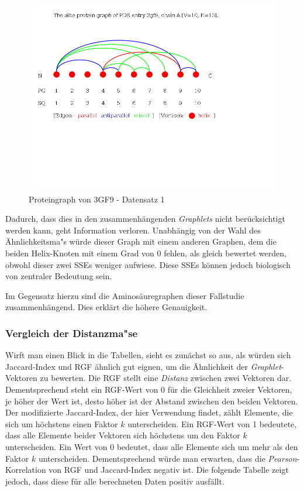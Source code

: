 \documentclass{report}
\begin{document}
\begin{figure}[h!]
\includegraphics[scale=0.5]{3gf9_A_albe_PG.png}
\caption{Proteingraph von 3GF9 - Datensatz 1}
\end{figure}

Dadurch, dass dies in den zusammenh\"angenden \textit{Graphlets} nicht ber\"ucksichtigt werden kann, geht Information verloren. Unabh\"angig von der Wahl des \"Ahnlichkeitsma"s w\"urde dieser Graph mit einem anderen Graphen, dem die beiden Helix-Knoten mit einem Grad von 0 fehlen, als gleich bewertet werden, obwohl dieser zwei SSEs weniger aufwiese. Diese SSEs k\"onnen jedoch biologisch von zentraler Bedeutung sein.

Im Gegensatz hierzu sind die Aminos\"auregraphen dieser Fallstudie zusammenh\"angend. Dies erkl\"art die h\"ohere Genauigkeit. 

\subsubsection{Vergleich der Distanzma"se}

Wirft man einen Blick in die Tabellen, sieht es zun\"achst so aus, als w\"urden sich Jaccard-Index und RGF \"ahnlich gut eignen, um die \"Ahnlichkeit der \textit{Graphlet}-Vektoren zu bewerten. Die RGF stellt eine \emph{Distanz} zwischen zwei Vektoren dar. Dementsprechend steht ein RGF-Wert von 0 f\"ur die Gleichheit zweier Vektoren, je h\"oher der Wert ist, desto h\"oher ist der Abstand zwischen den beiden Vektoren. Der modifizierte Jaccard-Index, der hier Verwendung findet, z\"ahlt Elemente, die sich um h\"ochstens einen Faktor $k$ unterscheiden. Ein RGF-Wert von 1 bedeutete, dass alle Elemente beider Vektoren sich h\"ochstens um den Faktor $k$ unterscheiden. Ein Wert von 0 bedeutet, dass alle Elemente sich um mehr als den Faktor $k$ unterscheiden. Dementsprechend w\"urde man erwarten, dass die \textit{Pearson}-Korrelation von RGF und Jaccard-Index negativ ist. Die folgende Tabelle zeigt jedoch, dass diese f\"ur alle berechneten Daten positiv ausf\"allt. 
\end{document}
